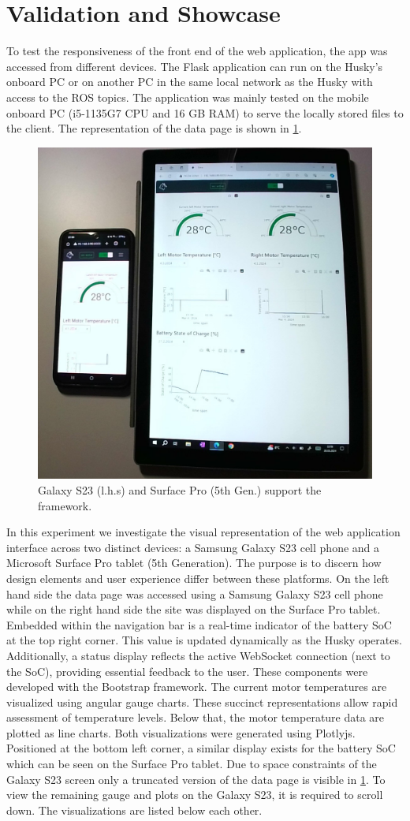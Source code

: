 \documentclass[conference]{IEEEtran}
\begin{document}
\section{Validation and Showcase}\label{VS}
To test the responsiveness of the front end of the web application, the app was accessed from different devices. The Flask application can run on the Husky's onboard PC or on another PC in the same local network as the Husky with access to the ROS topics. The application was mainly tested on the mobile onboard PC (i5-1135G7 CPU and 16 GB RAM) to serve the locally stored files to the client.
The representation of the data page is shown in \cref{fig:galaxysurface}. 
\begin{figure}[b]
    \centerline{\includegraphics[width=6.cm, height=5.cm]{Pictures/galaxysurfacecut.png}}
    \caption{Galaxy S23  (l.h.s) and Surface Pro (5th Gen.) support the framework.}
    \label{fig:galaxysurface}
\end{figure}
In this experiment we investigate the visual representation of the web application interface across two distinct devices: a Samsung Galaxy S23 cell phone and a Microsoft Surface Pro tablet (5th Generation). The purpose is to discern how design elements and user experience differ between these platforms.
On the left hand side the data page was accessed using a Samsung Galaxy S23 cell phone while on the right hand side the site was displayed on the Surface Pro tablet.
Embedded within the navigation bar is a real-time indicator of the battery SoC at the top right corner. This value is updated dynamically as the Husky operates.
Additionally, a status display reflects the active WebSocket connection (next to the SoC), providing essential feedback to the user.
These components were developed with the Bootstrap framework. The current motor temperatures are visualized using angular gauge charts. These succinct representations allow rapid assessment of temperature levels.
Below that, the motor temperature data are plotted as line charts. Both visualizations were generated using Plotlyjs.
Positioned at the bottom left corner, a similar display exists for the battery SoC which can be seen on the Surface Pro tablet. Due to space constraints of the Galaxy S23 screen only a truncated version of the data page is visible in \cref{fig:galaxysurface}. To view the remaining gauge and plots on the Galaxy S23, it is required to scroll down. The visualizations are listed below each other.  
\end{document}
